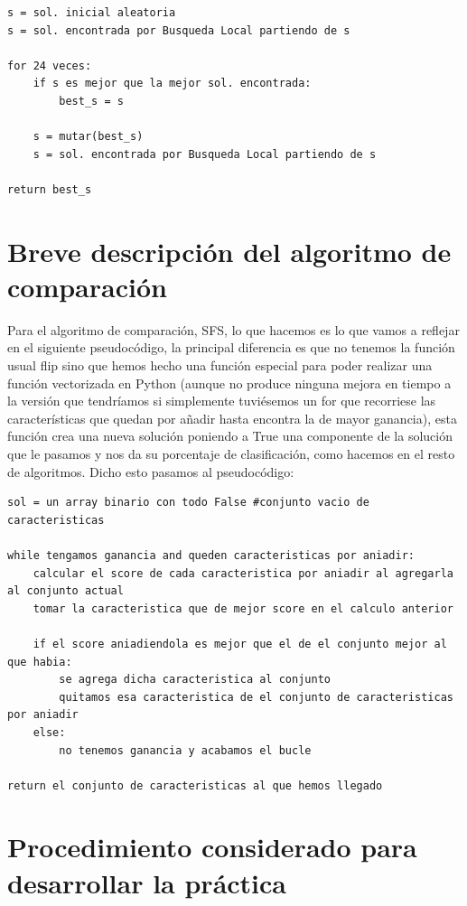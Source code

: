 \documentclass[10pt,a4paper]{article}
\begin{document}
\begin{lstlisting}
s = sol. inicial aleatoria
s = sol. encontrada por Busqueda Local partiendo de s

for 24 veces:
	if s es mejor que la mejor sol. encontrada:
		best_s = s
		
	s = mutar(best_s)
	s = sol. encontrada por Busqueda Local partiendo de s
	
return best_s
\end{lstlisting}
\newpage

\section{\color[rgb]{0.0,0.0,0.21}Breve descripción del algoritmo de comparación}

Para el algoritmo de comparación, SFS, lo que hacemos es lo que vamos a reflejar en el siguiente pseudocódigo, la principal diferencia es que no tenemos la función usual flip sino que hemos hecho una función especial para poder realizar una función vectorizada en Python (aunque no produce ninguna mejora en tiempo a la versión que tendríamos si simplemente tuviésemos un for que recorriese las características que quedan por añadir hasta encontra la de mayor ganancia), esta función crea una nueva solución poniendo a True una componente de la solución que le pasamos y nos da su porcentaje de clasificación, como hacemos en el resto de algoritmos. Dicho esto pasamos al pseudocódigo:

\begin{lstlisting}
sol = un array binario con todo False #conjunto vacio de caracteristicas

while tengamos ganancia and queden caracteristicas por aniadir:
	calcular el score de cada caracteristica por aniadir al agregarla al conjunto actual
	tomar la caracteristica que de mejor score en el calculo anterior
	
	if el score aniadiendola es mejor que el de el conjunto mejor al que habia:
		se agrega dicha caracteristica al conjunto
		quitamos esa caracteristica de el conjunto de caracteristicas por aniadir
	else:
		no tenemos ganancia y acabamos el bucle
		
return el conjunto de caracteristicas al que hemos llegado
\end{lstlisting}
\newpage

\section{\color[rgb]{0.0,0.0,0.21}Procedimiento considerado para desarrollar la práctica}
\end{document}
